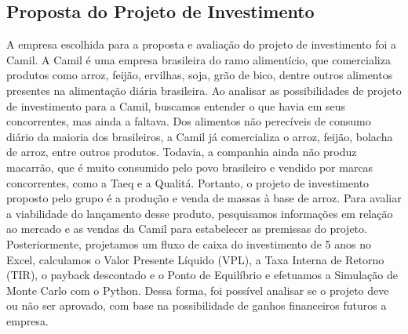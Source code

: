 \documentclass[11pt]{article}
\begin{document}
\subsection{\textbf{Proposta do Projeto de Investimento }}
A empresa escolhida para a proposta e avaliação do projeto de investimento foi a Camil. A Camil é uma empresa brasileira do ramo alimentício, que comercializa produtos como arroz, feijão, ervilhas, soja, grão de bico, dentre outros alimentos presentes na alimentação diária brasileira.
Ao analisar as possibilidades de projeto de investimento para a Camil, buscamos entender o que havia em seus concorrentes, mas ainda a faltava. Dos alimentos não perecíveis de consumo diário da maioria dos brasileiros, a Camil já comercializa o arroz, feijão, bolacha de arroz, entre outros produtos. Todavia, a companhia ainda não produz macarrão, que é muito consumido pelo povo brasileiro e vendido por marcas concorrentes, como a Taeq e a Qualitá. Portanto, o projeto de investimento proposto pelo grupo é a produção e venda de massas à base de arroz.
Para avaliar a viabilidade do lançamento desse produto, pesquisamos informações em relação ao mercado e as vendas da Camil para estabelecer as premissas do projeto. Posteriormente, projetamos um fluxo de caixa do investimento de 5 anos no Excel, calculamos o Valor Presente Líquido (VPL), a Taxa Interna de Retorno (TIR), o payback descontado e o Ponto de Equilíbrio e efetuamos a Simulação de Monte Carlo com o Python. Dessa forma, foi possível analisar se o projeto deve ou não ser aprovado, com base na possibilidade de ganhos financeiros futuros a empresa.
\end{document}
